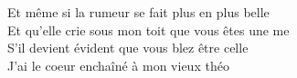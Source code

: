 \songwordfb{} Et même si la rumeur se fait  plus en plus belle \\
\songwordfb{} Et qu'elle crie sous mon toit que vous êtes une me \\
\songwordfb{} S'il devient évident que vous blez être celle \\
\songwordfb{} J'ai le coeur enchaîné à mon vieux théo \\
